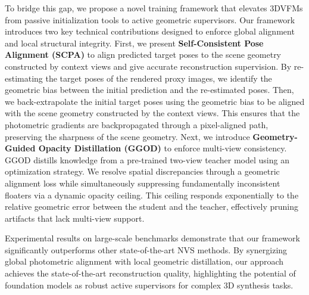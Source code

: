 To bridge this gap, we propose a novel training framework that elevates 3DVFMs from passive initialization tools to active geometric supervisors. 
Our framework introduces two key technical contributions designed to enforce global alignment and local structural integrity.
First, we present \textbf{Self-Consistent Pose Alignment (SCPA)} to align predicted target poses to the scene geometry constructed by context views and give accurate reconstruction supervision. 
By re-estimating the target poses of the rendered proxy images, we identify the geometric bias between the initial prediction and the re-estimated poses.
Then, we back-extrapolate the initial target poses using the geometric bias to be aligned with the scene geometry constructed by the context views.
This ensures that the photometric gradients are backpropagated through a pixel-aligned path, preserving the sharpness of the scene geometry.
Next, we introduce \textbf{Geometry-Guided Opacity Distillation (GGOD)} to enforce multi-view consistency. 
GGOD distills knowledge from a pre-trained two-view teacher model using an optimization strategy. 
We resolve spatial discrepancies through a geometric alignment loss while simultaneously suppressing fundamentally inconsistent floaters via a dynamic opacity ceiling. 
This ceiling responds exponentially to the relative geometric error between the student and the teacher, effectively pruning artifacts that lack multi-view support.

Experimental results on large-scale benchmarks \cite{ling2024dl3dv} demonstrate that our framework significantly outperforms other state-of-the-art NVS methods. By synergizing global photometric alignment with local geometric distillation, our approach achieves the state-of-the-art reconstruction quality, highlighting the potential of foundation models as robust active supervisors for complex 3D synthesis tasks.